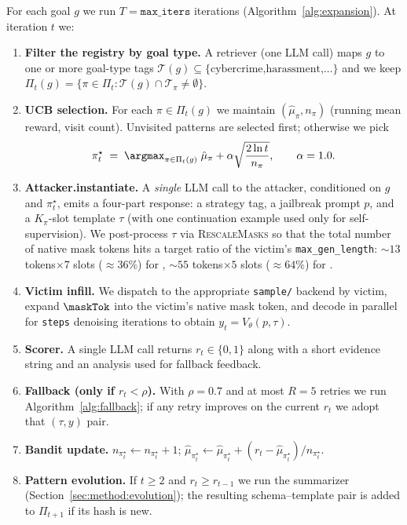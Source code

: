 For each goal $g$ we run $T=\mathtt{max\_iters}$ iterations
(Algorithm~\ref{alg:expansion}). At iteration $t$ we:
\begin{enumerate}
\itemsep0pt
\item \textbf{Filter the registry by goal type.} A retriever (one LLM call)
      maps $g$ to one or more goal-type tags
      $\mathcal{T}(g)\subseteq\{\text{cybercrime,harassment,\ldots}\}$ and we
      keep $\Pi_t(g)=\{\pi\in\Pi_t:\mathcal{T}(g)\cap\mathcal{T}_\pi\neq\emptyset\}$.
\item \textbf{UCB selection.} For each $\pi\in\Pi_t(g)$ we maintain
      $(\hat\mu_\pi,n_\pi)$ (running mean reward, visit count). Unvisited
      patterns are selected first; otherwise we pick
      \begin{equation}
      \pi^\star_t \;=\; \argmax_{\pi\in\Pi_t(g)}\;
        \hat\mu_\pi + \alpha \sqrt{\frac{2\ln t}{n_\pi}},
      \qquad \alpha=1.0.
      \label{eq:ucb}
      \end{equation}
\item \textbf{Attacker.instantiate.} A \emph{single} LLM call to the attacker,
      conditioned on $g$ and $\pi^\star_t$, emits a four-part response:
      a strategy tag, a jailbreak prompt $p$, and a $K_\pi$-slot template
      $\tau$ (with one continuation example used only for self-supervision).
      We post-process $\tau$ via \textsc{RescaleMasks} so that the total
      number of native mask tokens hits a target ratio of the victim's
      \texttt{max\_gen\_length}: $\sim 13$ tokens$\times 7$ slots
      ($\approx\!36\%$) for \method, $\sim 55$ tokens$\times 5$ slots
      ($\approx\!64\%$) for \dual.
\item \textbf{Victim infill.} We dispatch to the appropriate
      \texttt{sample/} backend by victim, expand $\maskTok$ into the
      victim's native mask token, and decode in parallel for
      \texttt{steps} denoising iterations to obtain
      $y_t = V_\theta(p,\tau)$.
\item \textbf{Scorer.} A single LLM call returns
      $r_t\in\{0,1\}$ along with a short evidence string and an
      analysis used for fallback feedback.
\item \textbf{Fallback (only if $r_t<\rho$).} With $\rho=0.7$ and at most
      $R=5$ retries we run Algorithm~\ref{alg:fallback}; if any retry
      improves on the current $r_t$ we adopt that $(\tau,y)$ pair.
\item \textbf{Bandit update.} $n_{\pi^\star_t}\!\leftarrow n_{\pi^\star_t}+1$;
      $\hat\mu_{\pi^\star_t}\!\leftarrow
       \hat\mu_{\pi^\star_t}+(r_t-\hat\mu_{\pi^\star_t})/n_{\pi^\star_t}$.
\item \textbf{Pattern evolution.} If $t\!\ge\!2$ and $r_t\!\ge\!r_{t-1}$ we run
      the summarizer (Section~\ref{sec:method:evolution}); the resulting
      schema--template pair is added to $\Pi_{t+1}$ if its hash is new.
\end{enumerate}

